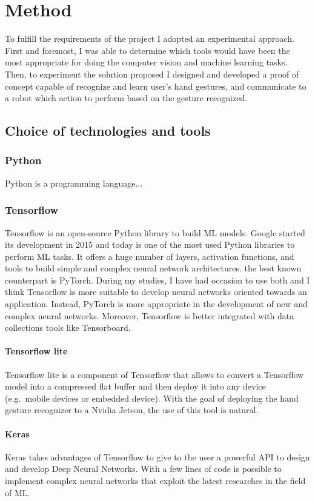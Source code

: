 \documentclass[../thesis.tex]{subfiles}
\begin{document}
\chapter{Method}\label{cap:methods}
To fulfill the requirements of the project I adopted an experimental approach. First and foremost, I was able to determine which tools would have been the most appropriate for doing the computer vision and machine learning tasks. Then, to experiment the solution proposed I designed and developed a proof of concept capable of recognize and learn user's hand gestures, and communicate to a robot which action to perform based on the gesture recognized.
\section{Choice of technologies and tools}\label{sec:technologies_and_tolls}
\subsection{Python}
Python is a programming language...

\subsection{Tensorflow}
Tensorflow is an open-source Python library to build \acrshort{ML} models. Google started its development in 2015 and today is one of the most used Python libraries to perform \acrshort{ML} tasks. It offers a huge number of layers, activation functions, and tools to build simple and complex neural network architectures. the best known counterpart is PyTorch. During my studies, I have had occasion to use both and I think Tensorflow is more suitable to develop neural networks oriented towards an application. Instead, PyTorch is more appropriate in the development of new and complex neural networks. Moreover, Tensorflow is better integrated with data collections tools like Tensorboard.

\subsubsection{Tensorflow lite}
Tensorflow lite is a component of Tensorflow that allows to convert a Tensorflow model into a compressed flat buffer and then deploy it into any device (e.g.\ mobile devices or embedded device). With the goal of deploying the hand gesture recognizer to a Nvidia Jetson, the use of this tool is natural.

\subsubsection{Keras}
Keras takes advantages of Tensorflow to give to the user a powerful API to design and develop Deep Neural Networks. With a few lines of code is possible to implement complex neural networks that exploit the latest researches in the field of \gls{ML}.
\end{document}
